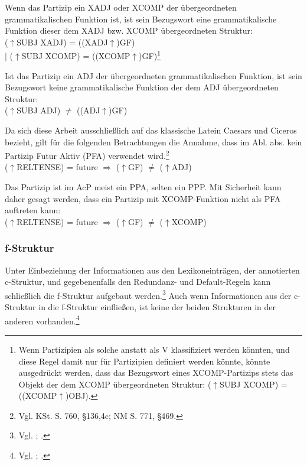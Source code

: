 \documentclass[12pt,a4paper]{article}
\begin{document}
Wenn das Partizip ein XADJ oder XCOMP der übergeordneten grammatikalischen Funktion ist, ist sein Bezugswort eine grammatikalische Funktion dieser dem XADJ bzw. XCOMP übergeordneten Struktur: \\
($\uparrow$SUBJ XADJ) = ((XADJ$\uparrow$)GF) \\
$\mid$ ($\uparrow$SUBJ XCOMP) = ((XCOMP$\uparrow$)GF)\footnote{Wenn Partizipien als solche anstatt als V klassifiziert werden könnten, und diese Regel damit nur für Partizipien definiert werden könnte, könnte ausgedrückt werden, dass das Bezugswort eines XCOMP-Partizips stets das Objekt der dem XCOMP übergeordneten Struktur: ($\uparrow$SUBJ XCOMP) = ((XCOMP$\uparrow$)OBJ).}

Ist das Partizip ein ADJ der übergeordneten grammatikalischen Funktion, ist sein Bezugswort keine grammatikalische Funktion der dem ADJ übergeordneten Struktur: \\
($\uparrow$SUBJ ADJ) $\neq$ ((ADJ$\uparrow$)GF)

Da sich diese Arbeit ausschließlich auf das klassische Latein Caesars und Ciceros bezieht, gilt für die folgenden Betrachtungen die Annahme, dass im Abl. abs. kein Partizip Futur Aktiv (PFA) verwendet wird.\footnote{Vgl. KSt. S. 760, §136,4c; NM S. 771, §469.}\\
($\uparrow$RELTENSE) = future $\Rightarrow$ ($\uparrow$GF) $\neq$ ($\uparrow$ADJ)

Das Partizip ist im AcP meist ein PPA, selten ein PPP. Mit Sicherheit kann daher gesagt werden, dass ein Partizip mit XCOMP-Funktion nicht als PFA auftreten kann: \\
($\uparrow$RELTENSE) = future $\Rightarrow$ ($\uparrow$GF) $\neq$ ($\uparrow$XCOMP)

\subsubsection{f-Struktur}
Unter Einbeziehung der Informationen aus den Lexikoneinträgen, der annotierten c-Struktur, und gegebenenfalls den Redundanz- und Default-Regeln kann schließlich die f-Struktur aufgebaut werden.\footnote{Vgl. \cite[13; 23]{Rohrer}; \cite[14]{Skript}.} Auch wenn Informationen aus der c-Struktur in die f-Struktur einfließen, ist keine der beiden Strukturen in der anderen vorhanden.\footnote{Vgl. \cite[26-7; 35]{Rohrer}; \cite[8]{Skript}.}
\end{document}
